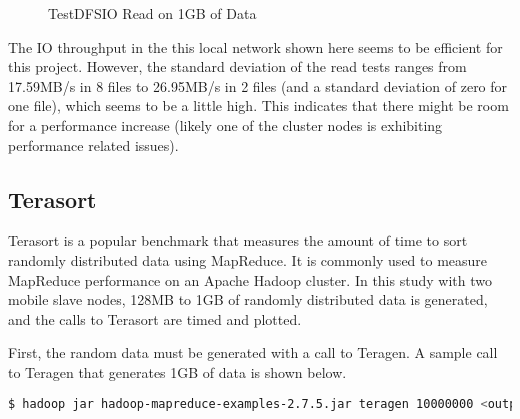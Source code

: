 \documentclass[10pt,journal,compsoc,float]{IEEEtran}
\begin{document}
\readdata

\begin{figure}[H]
	\centering
	\caption{TestDFSIO Read on 1GB of Data}
	\label{fig:TestDFSIO_read_1GB}
\end{figure}

The IO throughput in the this local network shown here seems to be efficient for this project. However, the standard deviation of the read tests ranges from 17.59MB/s in 8 files to 26.95MB/s in 2 files (and a standard deviation of zero for one file), which seems to be a little high. This indicates that there might be room for a performance increase (likely one of the cluster nodes is exhibiting performance related issues).

\subsection{Terasort}
\label{sec:Terasort}

Terasort is a popular benchmark that measures the amount of time to sort randomly distributed data using MapReduce. It is commonly used to measure MapReduce performance on an Apache Hadoop cluster. In this study with two mobile slave nodes, 128MB to 1GB of randomly distributed data is generated, and the calls to Terasort are timed and plotted.

First, the random data must be generated with a call to Teragen. A sample call to Teragen that generates 1GB of data is shown below.

\begin{lstlisting}[language=bash, otherkeywords={$}]
$ hadoop jar hadoop-mapreduce-examples-2.7.5.jar teragen 10000000 <output-dir>
\end{lstlisting}
\end{document}
